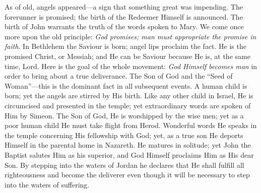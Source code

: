As of old, angels appeared—a sign that something great was impending. The forerunner is promised; the birth of the Redeemer Himself is announced. The birth of John warrants the truth of the words spoken to Mary. We come once more upon the old principle: \emph{God promises; man must appropriate the promise in faith}. In Bethlehem the Saviour is born; angel lips proclaim the fact. He is the promised Christ, or Messiah; and He can be Saviour because He is, at the same time, Lord. Here is the goal of the whole movement: \emph{God Himself becomes man} in order to bring about a true deliverance. The Son of God and the “Seed of Woman”—this is the dominant fact in all subsequent events. A human child is born; yet the angels are stirred by His birth. Like any other child in Israel, He is circumcised and presented in the temple; yet extraordinary words are spoken of Him by Simeon. The Son of God, He is worshipped by the wise men; yet as a poor human child He must take flight from Herod. Wonderful words He speaks in the temple concerning His fellowship with God; yet, as a true son He deports Himself in the parental home in Nazareth. He matures in solitude; yet John the Baptist salutes Him as his superior, and God Himself proclaims Him as His dear Son. By stepping into the waters of Jordan he declares that He shall fulfill all righteousness and become the deliverer even though it will be necessary to step into the waters of suffering.

